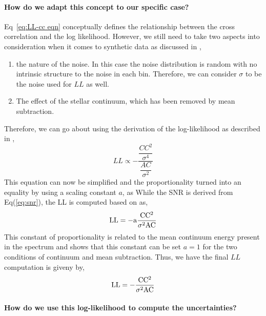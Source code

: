 \paragraph{How do we adapt this concept to our specific case?\\}

Eq~\ref{eq:LL-cc eqn} conceptually defines the relationship between the cross correlation and the log likelihood. 
However, we still need to take two aspects into consideration when it comes to synthetic data as discussed in \cite{2019Brogi},
\begin{enumerate}
    \item the nature of the noise. In this case the noise distribution is random with no intrinsic structure to the noise in each bin. Therefore, we can consider $\sigma$ to be the noise used for $LL$ as well.
    \item The effect of the stellar continuum, which has been removed by mean subtraction.
\end{enumerate}
Therefore, we can go about using the derivation of the log-likelihood as described in \cite{ruffio2019radial},
\begin{equation}
LL \propto -\dfrac{\dfrac{CC^2}{\sigma^4}}{\dfrac{AC}{\sigma^2}}
\end{equation}
This equation can now be simplified and the proportionality turned into an equality by using a scaling constant $a$, as
 While the SNR is derived from Eq(\ref{eq:snr}), the LL is computed based on \cite{ruffio2019radial} as,
 \begin{equation}
     \rm{LL}=-a\rm{\frac{CC^2}{\sigma^{2}AC}}
\end{equation}
This constant of proportionality is related to the mean continuum energy present in the spectrum and \cite{2003Zucker} shows that this constant can be set $a=1$ for the two conditions of continuum and mean subtraction.
Thus, we have the final $LL$ computation is giveny by,
 \begin{equation}
     \rm{LL}=-\rm{\frac{CC^2}{\sigma^{2}AC}}
     \label{eq:LL}
 \end{equation}

\paragraph{How do we use this log-likelihood to compute the uncertainties?\\}

